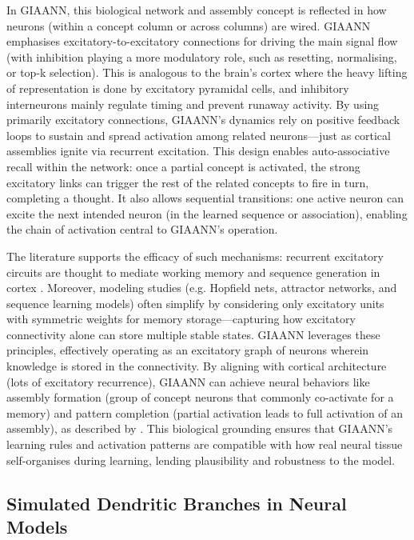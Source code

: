 In GIAANN, this biological network and assembly concept is reflected in how neurons (within a concept column or across columns) are wired.
GIAANN emphasises excitatory-to-excitatory connections for driving the main signal flow (with inhibition playing a more modulatory role, such as resetting, normalising, or top-k selection).
This is analogous to the brain’s cortex where the heavy lifting of representation is done by excitatory pyramidal cells, and inhibitory interneurons mainly regulate timing and prevent runaway activity.
By using primarily excitatory connections, GIAANN’s dynamics rely on positive feedback loops to sustain and spread activation among related neurons---just as cortical assemblies ignite via recurrent excitation.
This design enables auto-associative recall within the network: once a partial concept is activated, the strong excitatory links can trigger the rest of the related concepts to fire in turn, completing a thought.
It also allows sequential transitions: one active neuron can excite the next intended neuron (in the learned sequence or association), enabling the chain of activation central to GIAANN’s operation.

The literature supports the efficacy of such mechanisms: recurrent excitatory circuits are thought to mediate working memory and sequence generation in cortex \citep{holtmaat2016assembly}.
Moreover, modeling studies (e.g. Hopfield nets, attractor networks, and sequence learning models) often simplify by considering only excitatory units with symmetric weights for memory storage---capturing how excitatory connectivity alone can store multiple stable states.
GIAANN leverages these principles, effectively operating as an excitatory graph of neurons wherein knowledge is stored in the connectivity.
By aligning with cortical architecture (lots of excitatory recurrence), GIAANN can achieve neural behaviors like assembly formation (group of concept neurons that commonly co-activate for a memory) and pattern completion (partial activation leads to full activation of an assembly), as described by \citet{holtmaat2016assembly}.
This biological grounding ensures that GIAANN’s learning rules and activation patterns are compatible with how real neural tissue self-organises during learning, lending plausibility and robustness to the model.

\subsection{Simulated Dendritic Branches in Neural Models}\label{subsec:simulated-dendritic-branches}

